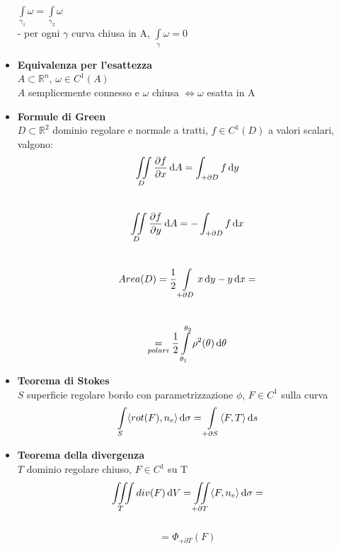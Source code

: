 \documentclass[a4paper,portrait,columns=3,5pt]{cheatsheet}
\begin{document}
\begin{itemize}
					$\int\limits_{\gamma_1} \omega = \int\limits_{\gamma_2}\omega$\\
				- per ogni $\gamma$ curva chiusa in A, $\int\limits_\gamma \omega = 0$
	\item \textbf{Equivalenza per l'esattezza}\\
			$A\subset \mathbb{R}^n$, $\omega \in C^1(A)$\\ $A$ semplicemente connesso e $\omega$ chiusa $\Leftrightarrow \omega$ esatta in A
	\item \textbf{Formule di Green}\\
			$D \subset \mathbb{R}^2$ dominio regolare e normale a tratti, $f \in C^1(D)$ a valori scalari, valgono:\\
			 $$\iint\limits_D\dfrac{\partial f}{\partial x} \dif A = \int_{+\partial D} f \dif y$$\\
			$$\iint\limits_D \dfrac{\partial f}{\partial y} \dif A = -\int_{+\partial D} f \dif x$$\\
			$$ Area(D) = \frac{1}{2} \int\limits_{+\partial D} x\dif y - y\dif x = $$ \\
			 $$ \underset{polari}{=} \frac{1}{2}\int\limits_{\theta_1}^{\theta_2} \rho^2(\theta) \dif \theta$$
	\item \textbf{Teorema di Stokes}\\ 
			$S$ superficie regolare bordo con parametrizzazione $\phi$, $F \in C^1$ sulla curva 
			$$ \int\limits_S \langle rot(F), n_e \rangle \dif \sigma = \int\limits_{+\partial S}\langle F, T \rangle \dif s$$ 
	\item \textbf{Teorema della divergenza}\\
			$T$ dominio regolare chiuso, $F \in C^1$ su T
			$$ \iiint\limits_T div(F) \dif V = \iint\limits_{+\partial T} \langle F, n_e \rangle \dif \sigma =$$ \\
			$$ = \Phi_{+\partial T}(F)$$
\end{itemize}
\end{document}

